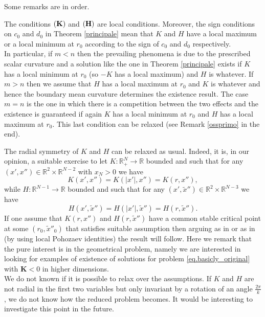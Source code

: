 \documentclass[11pt,a4paper]{amsart}
\begin{document}
Some remarks are in order.
\begin{remark}\label{R1}
The conditions $(\bf{K})$ and $(\bf{ H})$ are local conditions. Moreover, the sign conditions on $c_0$ and $d_0$ in Theorem \ref{principale}  mean that $K$ and $H$ have a local maximum or a local minimum at $r_0$ according to the sign of $c_0$ and $d_0$ respectively.\\ In particular, if $m<n$ then the prevailing phenomena is due to the prescribed scalar curvature and a solution like the one in Theorem \ref{principale} exists if $K$ has a local minimum at $r_0$ (so $-K$ has a local maximum) and $H$ is whatever.
If $m>n$ then we assume that $H$ has a local maximum at $r_0$ and $K$ is whatever and hence the boundary mean curvature determines the existence result. The case $m=n$ is the one in which there is a competition between the two effects and the existence is guaranteed if again $K$ has a local minimum at $r_0$ and $H$ has a local maximum at $r_0$. This last condition can be relaxed (see Remark \ref{ossprimo} in the end).
\end{remark}
\begin{remark}\label{R2}
The radial symmetry of $K$ and $H$ can be relaxed as usual. Indeed, it is, in our opinion, a suitable exercise to let $K:\mathbb R^N_+\to \mathbb R$ bounded and such that for any $(x', x'')\in\mathbb R^2\times\mathbb R^{N-2}$ with $x_N>0$ we have $$K(x', x'')=K(|x'|, x'')=K(r, x''),$$ while $H:\mathbb R^{N-1}\to \mathbb R$ bounded and such that for any $(x', \tilde x'')\in\mathbb R^2\times\mathbb R^{N-3}$ we have $$H(x',\tilde x'')=H(|x'|,\tilde x'')=H(r, \tilde x'').$$ If one assume that $K(r, x'')$ and $H(r, \tilde x'')$ have a common stable critical point at some $(r_0, \tilde x''_0)$ that satisfies suitable assumption then arguing as in \cite{BianChenYang} or as in \cite{PengWangWei} (by using local Pohozaev identities) the result will follow. Here we remark that the pure interest is in the geometrical problem, namely we are interested in looking for examples of existence of solutions for problem \eqref{eq.basicly_original} with $\mathbf{K}<0$ in higher dimensions.\\ We do not known if it is possible to relax over the assumptions. If $K$ and $H$ are not radial in the first two variables but only invariant by a rotation of an angle $\frac{2\pi}{k}$, we do not know how the reduced problem becomes. It would be interesting to investigate this point in the future.\end{remark}
\end{document}
